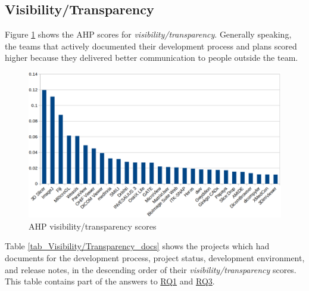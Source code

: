 \documentclass[3p, 12pt,authoryear]{elsarticle}
\begin{document}
\subsection{Visibility/Transparency} \label{sec_result_visibility_transparency}

Figure \ref{fg_visibility_transparency_scores} shows the AHP scores for
\textit{visibility/transparency}. Generally speaking, the teams that actively
documented their development process and plans scored higher because they
delivered better communication to people outside the team.

\begin{figure}[ht]
\includegraphics[scale=0.38]{figures/visibility_transparency_scores.png}
\caption{AHP visibility/transparency scores}
\label{fg_visibility_transparency_scores}
\end{figure}

Table \ref{tab_Visibility/Transparency_docs} shows the projects which had
documents for the development process, project status, development environment,
and release notes, in the descending order of their
\textit{visibility/transparency} scores. This table contains part of the answers
to \hyperlink{rq1}{RQ1} and \hyperlink{rq3}{RQ3}.
\end{document}
